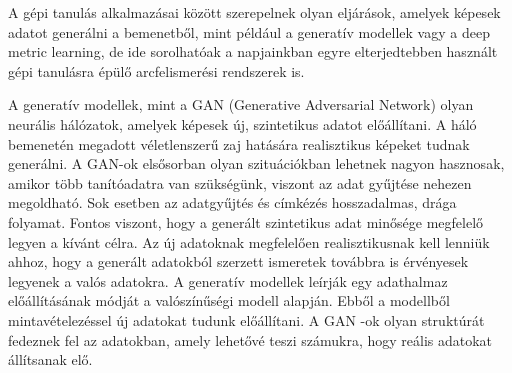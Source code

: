 
A gépi tanulás alkalmazásai között szerepelnek olyan eljárások, amelyek képesek adatot generálni a bemenetből, mint például a generatív modellek vagy a deep metric learning, de ide sorolhatóak a napjainkban egyre elterjedtebben használt gépi tanulásra épülő arcfelismerési rendszerek is.

A generatív modellek, mint a GAN (Generative Adversarial Network) olyan neurális hálózatok, amelyek képesek új, szintetikus adatot előállítani. A háló bemenetén megadott véletlenszerű zaj hatására realisztikus képeket tudnak generálni. A GAN-ok elsősorban olyan szituációkban lehetnek nagyon hasznosak, amikor több tanítóadatra van szükségünk, viszont az adat gyűjtése nehezen megoldható. Sok esetben az adatgyűjtés és címkézés hosszadalmas, drága folyamat. Fontos viszont, hogy a generált szintetikus adat minősége megfelelő legyen a kívánt célra. Az új adatoknak megfelelően realisztikusnak kell lenniük ahhoz, hogy a generált adatokból szerzett ismeretek továbbra is érvényesek legyenek a valós adatokra. A generatív modellek leírják egy adathalmaz előállításának módját a valószínűségi modell alapján. Ebből a modellből mintavételezéssel új adatokat tudunk előállítani. A GAN -ok olyan struktúrát fedeznek fel az adatokban, amely lehetővé teszi számukra, hogy reális adatokat állítsanak elő.




